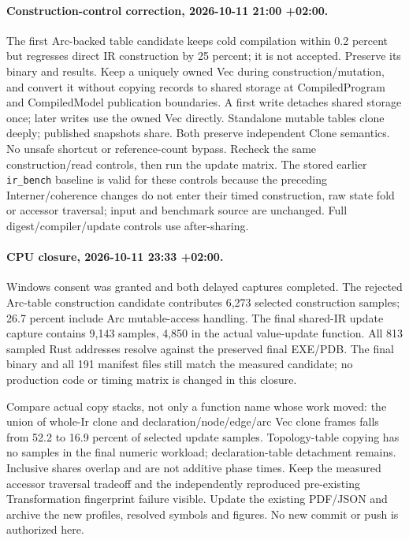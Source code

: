 \documentclass[11pt,a4paper]{article}
\begin{document}
\paragraph{Construction-control correction, 2026-10-11 21:00 +02:00.}
The first Arc-backed table candidate keeps cold compilation within 0.2 percent
but regresses direct IR construction by 25 percent; it is not accepted. Preserve
its binary and results. Keep a uniquely owned Vec during construction/mutation,
and convert it without copying records to shared storage at CompiledProgram and
CompiledModel publication boundaries. A first write detaches shared storage once;
later writes use the owned Vec directly. Standalone mutable tables clone deeply;
published snapshots share. Both preserve independent Clone semantics. No unsafe
shortcut or reference-count bypass. Recheck the same construction/read controls,
then run the update matrix. The stored earlier \texttt{ir\_bench} baseline is valid for
these controls because the preceding Interner/coherence changes do not enter their
timed construction, raw state fold or accessor traversal; input and benchmark
source are unchanged. Full digest/compiler/update controls use after-sharing.

\paragraph{CPU closure, 2026-10-11 23:33 +02:00.}
Windows consent was granted and both delayed captures completed. The rejected
Arc-table construction candidate contributes 6,273 selected construction samples;
26.7 percent include Arc mutable-access handling. The final shared-IR update
capture contains 9,143 samples, 4,850 in the actual value-update function. All 813
sampled Rust addresses resolve against the preserved final EXE/PDB. The final
binary and all 191 manifest files still match the measured candidate; no production
code or timing matrix is changed in this closure.

Compare actual copy stacks, not only a function name whose work moved: the union
of whole-Ir clone and declaration/node/edge/arc Vec clone frames falls from 52.2 to
16.9 percent of selected update samples. Topology-table copying has no samples in
the final numeric workload; declaration-table detachment remains. Inclusive
shares overlap and are not additive phase times. Keep the measured accessor
traversal tradeoff and the independently reproduced pre-existing Transformation
fingerprint failure visible. Update the existing PDF/JSON and archive the new
profiles, resolved symbols and figures. No new commit or push is authorized here.
\end{document}
